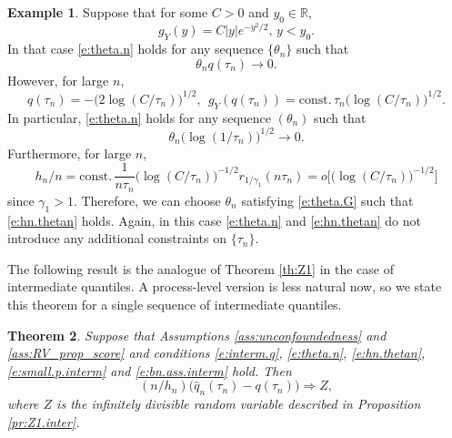 \documentclass[12pt]{amsart}
\newcommand{\bbr}{\mathbb{R}}
\newcommand{\1}{\mathbbm{1}}
\newcommand{\0}{\mathbf{0}}
\theoremstyle{plain}
\newtheorem{theorem}{Theorem}[section]
\theoremstyle{definition}
\newtheorem{example}[theorem]{Example}
\begin{document}
\begin{example}
\label{ex:example3}
  Suppose that for some $C>0$ and $y_0\in\bbr$,
\begin{equation*}
 g_Y(y) = C|y|e^{-y^2/2},  \, y<y_0. 
\end{equation*}
In that case \eqref{e:theta.n} holds for any sequence
$\{\theta_n\}$ such that
$$
\theta_nq(\tau_n)\to 0.
$$
However, for large $n$, 
$$
q(\tau_n) = -\bigl( 2\log (C/\tau_n)\bigr)^{1/2}, \ \ 
g_Y(q(\tau_n))= \text{const.} \, \tau_n\bigl( \log (C/\tau_n)\bigr)^{1/2}. 
$$
In particular, \eqref{e:theta.n} holds for any sequence
$(\theta_n)$ such that
\begin{equation} \label{e:theta.G}
\theta_n \bigl( \log (1/\tau_n)\bigr)^{1/2}\to 0.
\end{equation} 
Furthermore, for large $n$, 
$$
h_n/n =  \text{const.} \,\frac{1}{n \tau_n}\bigl( \log (C/\tau_n)\bigr)^{-1/2}
r_{1/\gamma_1}(n\tau_n)  = o\bigl[ \bigl( \log (C/\tau_n)\bigr)^{-1/2}\bigr]
$$
since $\gamma_1>1$. Therefore, we can choose $\theta_n$ satisfying
\eqref{e:theta.G} such that  
\eqref{e:hn.thetan} holds. Again, in this case \eqref{e:theta.n} and
\eqref{e:hn.thetan} do not introduce any additional constraints on
$\{\tau_n\}$. 
\end{example}

The following result is the analogue of Theorem \ref{th:Z1} in the case of intermediate quantiles. A process-level version is less natural now, so we state this theorem for a single sequence of intermediate quantiles. 

 \begin{theorem} \label{t:quant.lim.interm}
   Suppose that  Assumptions \ref{ass:unconfoundedness} and \ref{ass:RV_prop_score} and conditions \eqref{e:interm.q}, \eqref{e:theta.n}, \eqref{e:hn.thetan}, \eqref{e:small.p.interm} and 
   \eqref{e:bn.ass.interm} 
   hold. Then  
   $$
   (n/h_n)\bigl( \hat q_n(\tau_n) -q(\tau_n)\bigr) \Rightarrow Z, 
   $$
   where $Z$ is the infinitely divisible random variable described in
   Proposition \ref{pr:Z1.inter}. 
  \end{theorem}
\end{document}
